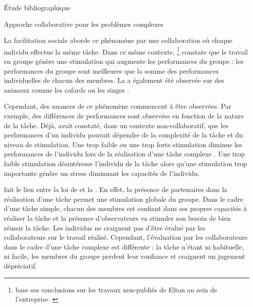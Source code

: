 \documentclass[myfrancais,ngerman,english,frenchb]{mythesis}
\begin{document}
\begin{mychapter}{Étude bibliographique}
\begin{mysection}{Approche collaborative pour les problèmes complexes}
\begin{mysubsection}{La facilitation sociale}
				 aborde ce phénomène par une collaboration où chaque individu effectue la même tâche.
				Dans ce même contexte, \footnote{ base ses conclusions sur les travaux non-publiés de Elton  au sein de l'entreprise \myHawthorne.} constate que le travail en groupe génère une stimulation qui augmente les performances du groupe : les performances du groupe sont meilleures que la somme des performances individuelles de chacun des membres.
				La  a également été observée sur des animaux comme les cafards  ou les singes .

				Cependant, des nuances de ce phénomène commencent à être observées.
				Par exemple, des différences de performances sont observées en fonction de la nature de la tâche.
				Déjà,  avait constaté, dans un contexte non-collaboratif, que les performances d'un individu pouvait dépendre de la complexité de la tâche et du niveau de stimulation.
				Une trop faible ou une trop forte stimulation diminue les performances de l'individu lors de la réalisation d'une tâche complexe .
				Une trop faible stimulation désintéresse l'individu de la tâche alors qu'une stimulation trop importante génère un stress diminuant les capacités de l'individu.

				 fait le lien entre la loi de  et la .
				En effet, la présence de partenaires dans la réalisation d'une tâche permet une stimulation globale du groupe.
				Dans le cadre d'une tâche simple, chacun des membres est confiant dans ses propres capacités à réaliser la tâche et la présence d'observateurs va stimuler son besoin de bien réussir la tâche.
				Les individus ne craignent pas d'être évalué par les collaborateurs sur le travail réalisé.
				Cependant, l'évaluation par les collaborateurs dans le cadre d'une tâche complexe est différente : la tâche n'étant ni habituelle, ni facile, les membres du groupe perdent leur confiance et craignent un jugement dépréciatif.


\end{mysubsection}
\end{mysection}
\end{mychapter}
\end{document}
